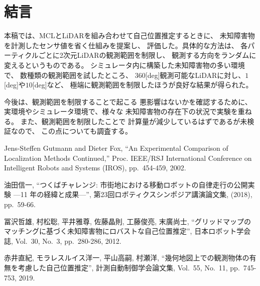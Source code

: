 \documentclass{jarticle}
\begin{document}
\section{結言}%

本稿では、MCLとLiDARを組み合わせて自己位置推定するときに、
未知障害物を計測したセンサ値を省く仕組みを提案し、
評価した。具体的な方法は、
各パーティクルごとに2次元LiDARの観測範囲を制限し、
観測する方向をランダムに変えるというものである。
シミュレータ内に構築した未知障害物の多い環境で、
数種類の観測範囲を試したところ、
$360$[deg]観測可能なLiDARに対し、$1$[deg]や$10$[deg]など、
極端に観測範囲を制限したほうが良好な結果が得られた。


今後は、観測範囲を制限することで起こる
悪影響はないかを確認するために、
実環境やシミュレータ環境で、様々な
未知障害物の存在下の状況で実験を重ねる。
また、観測範囲を制限したことで
計算量が減少しているはずであるが未検証なので、
この点についても調査する。




\footnotesize
\begin{thebibliography}{99}

  Jens-Steffen Gutmann and Dieter Fox, 
  ``An Experimental Comparison of Localization Methods Continued,''
  Proc. IEEE/RSJ International Conference on Intelligent Robots and Systems (IROS), pp.~454-459, 2002.

  油田信一, ``つくばチャレンジ: 市街地における移動ロボットの自律走行の公開実験 ---11 年の経緯と成果---'',
  第23回ロボティクスシンポジア講演論文集, (2018), pp.~59-66.
  
  冨沢哲雄, 村松聡, 平井雅尊, 佐藤晶則, 工藤俊亮, 末廣尚士, 
  ``グリッドマップのマッチングに基づく未知障害物にロバストな自己位置推定'', 日本ロボット学会誌, Vol.~30, No.~3, pp.~280-286, 2012.
  
  赤井直紀, モラレスルイス洋一, 平山高嗣, 村瀬洋, 
  ``幾何地図上での観測物体の有無を考慮した自己位置推定'', 計測自動制御学会論文集, Vol.~55, No.~11, pp.~745-753, 2019.
  

\end{thebibliography}

\normalsize
\end{document}
